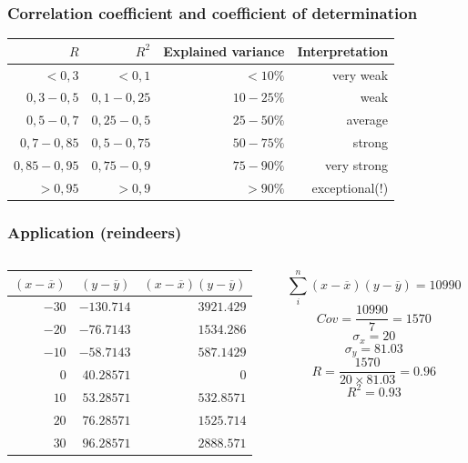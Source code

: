 \documentclass{beamer}
\begin{document}
\begin{frame}
  \frametitle{Correlation coefficient and coefficient of determination}
  \begin{table}[h] \centering
    \begin{tabular}{@{}|r|r|r|r|@{}}
    	\toprule
    	          $R$ &       $R^{2}$ & Explained variance &   Interpretation \\ \midrule
    	      $< 0,3$ &       $< 0,1$ &           $< 10\%$ &        very weak \\
    	  $0,3 - 0,5$ & $0,1 - 0,25$ &        $10 - 25\%$ &             weak \\
    	  $0,5 - 0,7$ &  $0,25 - 0,5$ &        $25 - 50\%$ &          average \\
    	 $0,7 - 0,85$ &  $0,5 - 0,75$ &        $50 - 75\%$ &           strong \\
    	$0,85 - 0,95$ &  $0,75 - 0,9$ &        $75 - 90\%$ &      very strong \\
    	     $> 0,95$ &       $> 0,9$ &            $>90\%$ & exceptional(!) \\ \bottomrule
    \end{tabular}
  \end{table}

\end{frame}

\begin{frame}
  \frametitle{Application (reindeers)}
  \begin{columns}
    \begin{column}{0.5\textwidth}
      \begin{table}[h] \centering
        \begin{tabular}{@{}rrr@{}} \toprule
          $(x-\overline{x})$ & $(y - \overline{y})$ & $(x-\overline{x})(y - \overline{y})$ \\
          \midrule
          $-30$ & $-130.714$ & $3921.429$ \\
          $-20$ & $-76.7143$ & $1534.286$ \\
          $-10$ & $-58.7143$ & $587.1429$\\
          $0$   & $40.28571$ & $0$\\
          $10$  & $53.28571$ & $532.8571$\\
          $20$  & $76.28571$ & $1525.714$\\
          $30$  & $96.28571$ & $2888.571$\\
          \bottomrule
        \end{tabular}
      \end{table}
    \end{column}
    \begin{column}{0.5\textwidth}
      \[ \sum_{i}^{n} (x-\overline{x})(y - \overline{y}) = 10990 \]
      \[ Cov = \frac{10990}{7} = 1570 \]
      \[ \sigma_{x} = 20 \]
      \[ \sigma_{y} = 81.03 \]
      \[ R = \frac{1570}{20 \times 81.03} = 0.96 \]
      \[ R^{2} = 0.93 \]
    \end{column}
  \end{columns}
\end{frame}
\end{document}
